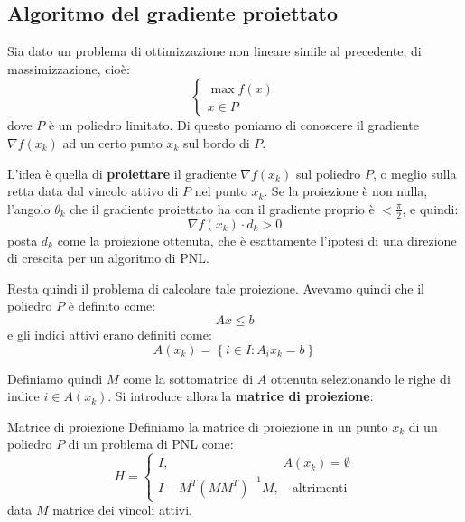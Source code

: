 \documentclass[a4paper,11pt]{article}
\begin{document}
\begin{itemize}
\begin{center}

\end{center}
\end{itemize}

\subsection{Algoritmo del gradiente proiettato}
Sia dato un problema di ottimizzazione non lineare simile al precedente, di massimizzazione, cioè:
\[
	\begin{cases}
		\max f(x) \\ 
		x \in P
	\end{cases}
\]
dove $P$ è un poliedro limitato.
Di questo poniamo di conoscere il gradiente $\nabla f(x_k)$ ad un certo punto $x_k$ sul bordo di $P$.

L'idea è quella di \textbf{proiettare} il gradiente $\nabla f(x_k)$ sul poliedro $P$, o meglio sulla retta data dal vincolo attivo di $P$ nel punto $x_k$.
Se la proiezione è non nulla, l'angolo $\theta_k$ che il gradiente proiettato ha con il gradiente proprio è $< \frac{\pi}{2}$, e quindi:
$$
\nabla f(x_k) \cdot d_k > 0
$$
posta $d_k$ come la proiezione ottenuta, che è esattamente l'ipotesi di una direzione di crescita per un algoritmo di PNL.

Resta quindi il problema di calcolare tale proiezione.
Avevamo quindi che il poliedro $P$ è definito come:
$$
Ax \leq b
$$
e gli indici attivi erano definiti come:
$$
A(x_k) = \left\{ i \in I: A_ix_k = b \right\}
$$

Definiamo quindi $M$ come la sottomatrice di $A$ ottenuta selezionando le righe di indice $i \in A(x_k)$. 
Si introduce allora la \textbf{matrice di proiezione}:
\begin{definition}{Matrice di proiezione}
	Definiamo la matrice di proiezione in un punto $x_k$ di un poliedro $P$ di un problema di PNL come: 
	$$
		H = 
			\begin{cases}
				I , \quad \quad \quad \quad \quad \quad \quad \quad \quad  A(x_k) = \emptyset \\ 
				I - M^T(M M^T)^{-1} M, \quad \text{altrimenti}
			\end{cases}
	$$
	data $M$ matrice dei vincoli attivi.
\end{definition}
\end{document}
